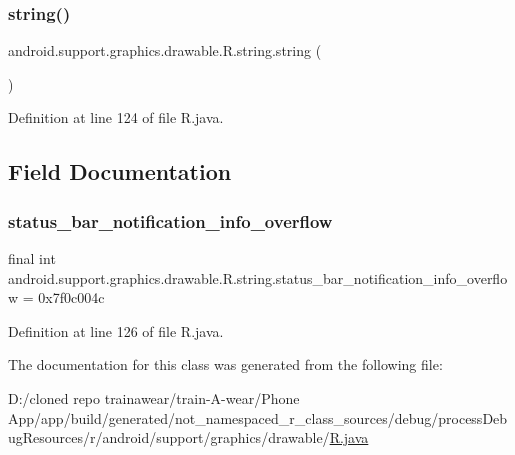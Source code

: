 \subsubsection{\texorpdfstring{string()}{string()}}
{\footnotesize\ttfamily android.\+support.\+graphics.\+drawable.\+R.\+string.\+string (\begin{DoxyParamCaption}{ }\end{DoxyParamCaption})\hspace{0.3cm}{\ttfamily [private]}}



Definition at line 124 of file R.\+java.


\begin{DoxyCode}{0}

\end{DoxyCode}


\subsection{Field Documentation}
\mbox{\label{classandroid_1_1support_1_1graphics_1_1drawable_1_1_r_1_1string_afa1adb5f8eacaefd685b9cfa844e77de}} 
\subsubsection{\texorpdfstring{status\_bar\_notification\_info\_overflow}{status\_bar\_notification\_info\_overflow}}
{\footnotesize\ttfamily final int android.\+support.\+graphics.\+drawable.\+R.\+string.\+status\+\_\+bar\+\_\+notification\+\_\+info\+\_\+overflow = 0x7f0c004c\hspace{0.3cm}{\ttfamily [static]}}



Definition at line 126 of file R.\+java.



The documentation for this class was generated from the following file\+:\begin{DoxyCompactItemize}
\item 
D\+:/cloned repo trainawear/train-\/\+A-\/wear/\+Phone App/app/build/generated/not\+\_\+namespaced\+\_\+r\+\_\+class\+\_\+sources/debug/process\+Debug\+Resources/r/android/support/graphics/drawable/\mbox{\hyperlink{process_debug_resources_2r_2android_2support_2graphics_2drawable_2_r_8java}{R.\+java}}\end{DoxyCompactItemize}

